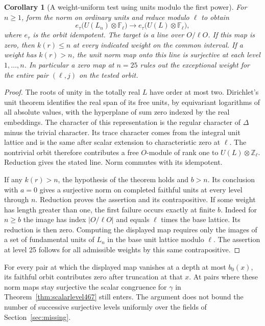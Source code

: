 \documentclass[a4paper,11pt]{article}
\newtheorem{corollary}[proposition]{Corollary}
\theoremstyle{definition}
\theoremstyle{remark}
\newcommand{\ZZ}{\mathbb Z}\newcommand{\ord}{\operatorname{ord}}
\numberwithin{equation}{section}
\begin{document}
\begin{corollary}[A weight-uniform test using units modulo the first power]\leavevmode
\label{cor:unitcap505}
For \(n\ge1\), form the norm on ordinary units and reduce
modulo \(\ell\) to obtain
\[
    e_\tau\bigl(U(L_n)\otimes\mathbb F_\ell\bigr)
         \longrightarrow e_\tau\bigl(U(L)\otimes\mathbb F_\ell\bigr),
\]
where \(e_\tau\) is the orbit idempotent. The target is a line
over \(O/\ell O\). If this map is zero, then \(k(r)\le n\)
at \emph{every} indicated weight on the common interval.
If a weight has \(k(r)>n\), the unit norm map onto this line
is surjective at each level \(1,\ldots,n\). In particular a
zero map at \(n=25\) rules out the exceptional weight for the
entire pair \((\ell,j)\) on the tested orbit.
\end{corollary}
\begin{proof}
The roots of unity in the totally real \(L\) have order
at most two. Dirichlet's unit theorem identifies the real span
of its free units, by equivariant logarithms of all absolute
values, with the hyperplane of sum zero indexed by the real
embeddings. The character of this representation is the
regular character of \(\Delta\) minus the trivial character.
Its trace character comes from the integral unit lattice and
is the same after scalar extension to characteristic zero at
\(\ell\). The nontrivial orbit therefore contributes a free
\(O\)-module of rank one to \(U(L)\otimes\ZZ_\ell\). Reduction
gives the stated line. Norm commutes with its idempotent.

If any \(k(r)>n\), the hypothesis of the theorem holds and
\(b>n\). Its conclusion with \(a=0\) gives a surjective norm
on completed faithful units at every level through \(n\).
Reduction proves the assertion and its contrapositive.
If some weight has length greater than one, the first failure
occurs exactly at finite \(b\). Indeed for \(n\ge b\)
the image has index \(|O/\ell O|\) and equals \(\ell\) times
the base lattice. Its reduction is then zero. Computing the
displayed map requires only the images of a set of fundamental
units of \(L_n\) in the base unit lattice modulo \(\ell\).
The assertion at level 25 follows for all admissible weights
by this same contrapositive.
\end{proof}

For every pair at which the displayed map vanishes at a depth
at most \(b_0(x)\), its faithful orbit contributes zero after
truncation at that \(x\). At pairs where these norm maps stay
surjective the scalar congruence for \(\gamma\) in
Theorem~\ref{thm:scalarlevel467} still enters. The argument
does not bound the number of successive surjective levels
uniformly over the fields of Section~\ref{sec:missing}.
\end{document}
